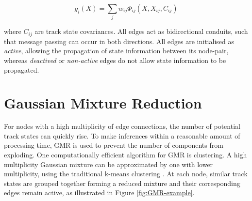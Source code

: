 \begin{equation}
g_i(X) = \sum_{j} w_{ij}\Phi_{ij}(X, X_{ij}, C_{ij})
\label{eqn:gaussian-mixture}
\end{equation}

where $C_{ij}$ are track state covariances. All edges act as bidirectional conduits, such that message passing can occur in both directions. All edges are initialised as \textit{active}, allowing the propagation of state information between its node-pair, whereas \textit{deactived} or \textit{non-active} edges do not allow state information to be propagated. 






\section{Gaussian Mixture Reduction}
\label{section-GMR}

For nodes with a high multiplicity of edge connections, the number of potential track states can quickly rise. To make inferences within a reasonable amount of processing time, GMR is used to prevent the number of components from exploding. One computationally efficient algorithm for GMR is clustering. A high multiplicity Gaussian mixture can be approximated by one with lower multiplicity, using the traditional k-means clustering \cite{kmeans}. At each node, similar track states are grouped together forming a reduced mixture and their corresponding edges remain active, as illustrated in Figure \ref{fig:GMR-example}. 



